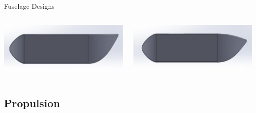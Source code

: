 \documentclass{beamer}
\newcommand{\setpresentername}[1]{\renewcommand{\presentername}{#1}}
\newcommand{\setpresentertitle}[1]{\renewcommand{\presentertitle}{#1}}
\newcommand{\presentername}{}
\newcommand{\presentertitle}{}
\begin{document}
\begin{frame}{Fuselage Designs}
        \begin{columns}[T]
            \begin{column}{0.5\textwidth}
                \centering
                \includegraphics[width=\textwidth]{figures/fuselage/Fuselage1.2.2.jpg}
                \vspace{0.5em} %
            \end{column}
    
            \begin{column}{0.5\textwidth}
                \centering
                \includegraphics[width=\textwidth]{figures/fuselage/Fuselage1.2.3.jpg}
                \vspace{0.5em} %
            \end{column}
        \end{columns}
\end{frame}
    
    \subsection{Propulsion}

    \setpresentername{Lucas Tavares Vasconcellos}
    \setpresentertitle{Structural Engineer}
\end{document}
